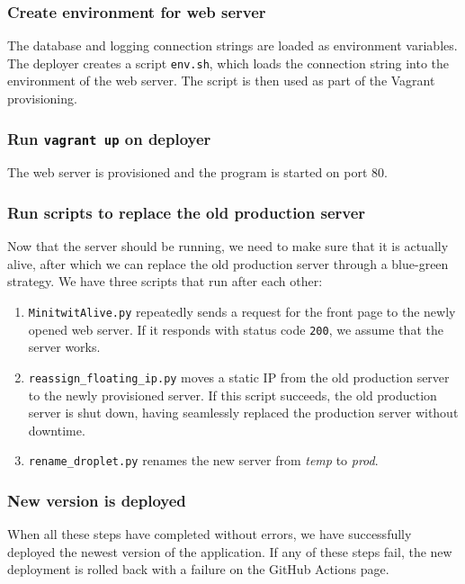 \subsubsection{Create environment for web server}
The database and logging connection strings are loaded as environment variables. The deployer creates a script \texttt{env.sh}, which loads the connection string into the environment of the web server. The script is then used as part of the Vagrant provisioning.

\subsubsection{Run \texttt{vagrant up} on deployer}
The web server is provisioned and the program is started on port 80.

\subsubsection{Run scripts to replace the old production server}
Now that the server should be running, we need to make sure that it is actually alive, after which we can replace the old production server through a blue-green strategy. We have three scripts that run after each other:
\begin{enumerate}
    \item \texttt{MinitwitAlive.py} repeatedly sends a request for the front page to the newly opened web server. If it responds with status code \texttt{200}, we assume that the server works.
    \item \texttt{reassign\_floating\_ip.py} moves a static IP from the old production server to the newly provisioned server. If this script succeeds, the old production server is shut down, having seamlessly replaced the production server without downtime.
    \item \texttt{rename\_droplet.py} renames the new server from \textit{temp} to \textit{prod}.
\end{enumerate}

\subsubsection{New version is deployed}
When all these steps have completed without errors, we have successfully deployed the newest version of the application. If any of these steps fail, the new deployment is rolled back with a failure on the GitHub Actions page.